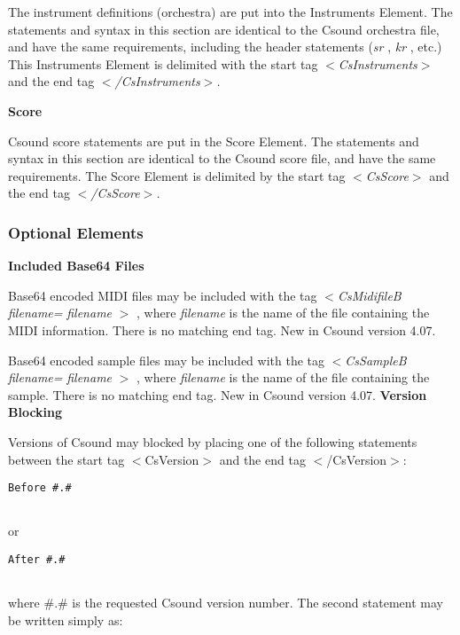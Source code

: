   The instrument definitions (orchestra) are put into the Instruments Element. The statements and syntax in this section are identical to the Csound orchestra file, and have the same requirements, including the header statements (\emph{sr}
, \emph{kr}
, etc.) This Instruments Element is delimited with the start tag \emph{$<$CsInstruments$>$}
 and the end tag \emph{$<$/CsInstruments$>$.}

\textbf{Score}


  Csound score statements are put in the Score Element. The statements and syntax in this section are identical to the Csound score file, and have the same requirements. The Score Element is delimited by the start tag \emph{$<$CsScore$>$ }
and the end tag \emph{$<$/CsScore$>$.}

\subsubsection*{Optional Elements}
\textbf{Included Base64 Files}


  Base64 encoded MIDI files may be included with the tag \emph{$<$CsMidifileB filename=}
\emph{filename}
\emph{$>$}
, where \emph{filename}
 is the name of the file containing the MIDI information. There is no matching end tag. New in Csound version 4.07. 


  Base64 encoded sample files may be included with the tag \emph{$<$CsSampleB filename=}
\emph{filename}
\emph{$>$}
, where \emph{filename}
 is the name of the file containing the sample. There is no matching end tag. New in Csound version 4.07. 
\textbf{Version Blocking}


  Versions of Csound may blocked by placing one of the following statements between the start tag $<$CsVersion$>$ and the end tag $<$/CsVersion$>$: 


 
\begin{lstlisting}
Before #.#
            
\end{lstlisting}


 
 or 

 
\begin{lstlisting}
After #.#
            
\end{lstlisting}


 
 where \#.\# is the requested Csound version number. The second statement may be written simply as: 

